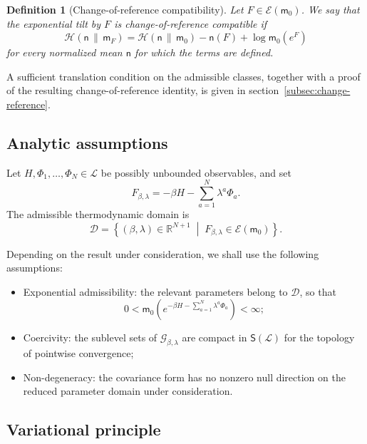 \documentclass[10pt,a4paper]{amsart}
\newtheorem{Definition}[Theorem]{Definition}
\begin{document}
\begin{Definition}[Change-of-reference compatibility]
\label{def:change-reference-compatible}
Let $F\in\mathcal E(\mathsf m_0)$. We say that the exponential tilt by
$F$ is \emph{change-of-reference compatible} if
\[
\mathcal H(\mathsf n\,\|\,\mathsf m_F)
=
\mathcal H(\mathsf n\,\|\,\mathsf m_0)
-\mathsf n(F)
+\log\mathsf m_0(e^F)
\]
for every normalized mean $\mathsf n$ for which the terms are defined.
\end{Definition}

A sufficient translation condition on the admissible classes, together
with a proof of the resulting change-of-reference identity, is given in
section~\ref{subsec:change-reference}.

\subsection{Analytic assumptions}

Let $H,\Phi_1,\ldots,\Phi_N\in\mathcal L$ be possibly unbounded
observables, and set
\[
F_{\beta,\lambda}
=
-\beta H-\sum_{a=1}^{N}\lambda^a\Phi_a.
\]
The admissible thermodynamic domain is
\[
\mathcal D
=
\left\{
(\beta,\lambda)\in\mathbb R^{N+1}
\;\middle|\;
F_{\beta,\lambda}\in\mathcal E(\mathsf m_0)
\right\}.
\]

Depending on the result under consideration, we shall use the following
assumptions:

\begin{itemize}
\item[(A1)] Exponential admissibility: the relevant parameters belong
to $\mathcal D$, so that
\[
0<
\mathsf m_0\left(
e^{-\beta H-\sum_{a=1}^{N}\lambda^a\Phi_a}
\right)
<\infty;
\]

\item[(A2)] Coercivity: the sublevel sets of
$\mathcal G_{\beta,\lambda}$ are compact in
$\mathsf S(\mathcal L)$ for the topology of pointwise convergence;

\item[(A3)] Non-degeneracy: the covariance form has no nonzero null
direction on the reduced parameter domain under consideration.
\end{itemize}

\subsection{Variational principle}
\end{document}
